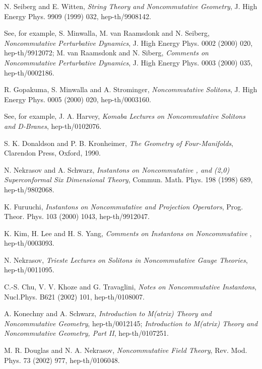 \documentclass[a4paper,a4paper]{article}
\begin{document}
\begin{thebibliography}{99}

 N. Seiberg and E. Witten, {\it String Theory
and Noncommutative Geometry}, J. High Energy Phys. 9909 (1999)
032, hep-th/9908142.

 See, for example, S. Minwalla, M. van Raamsdonk
 and N. Seiberg,
{\it Noncommutative Perturbative Dynamics}, J. High Energy Phys.
0002 (2000) 020, hep-th/9912072; M. van Raamsdonk and N. Siberg,
{\it Comments on Noncommutative Perturbative Dynamics}, J. High
Energy Phys. 0003 (2000) 035, hep-th/0002186.

 R. Gopakuma, S. Minwalla and A. Strominger,
{\it Noncommutative Solitons}, J. High Energy Phys. 0005 (2000)
020, hep-th/0003160.

 See, for example, J. A. Harvey, {\it Komaba Lectures
on Noncommutative Solitons and D-Branes}, hep-th/0102076.

 S. K. Donaldson and P. B. Kronheimer, {\it The
Geometry of Four-Manifolds}, Clarendon Press, Oxford, 1990.

 N. Nekrasov and A. Schwarz, {\it Instantons on
Noncommutative \coordHE{}, and (2,0) Superconformal Six Dimensional
Theory}, Commun. Math. Phys. 198 (1998) 689, hep-th/9802068.

 K. Furuuchi, {\it Instantons on Noncommutative
\coordHE{} and Projection Operators}, Prog. Theor. Phys. 103 (2000)
1043, hep-th/9912047.

 K. Kim, H. Lee and H. S. Yang, {\it Comments on
Instantons on Noncommutative \coordHE{}}, hep-th/0003093.

 N. Nekrasov, {\it Trieste Lectures on Solitons in
Noncommutative Gauge Theories}, hep-th/0011095.

 C.-S. Chu, V. V. Khoze and G. Travaglini, {\it
Notes on Noncommutative Instantons}, Nucl.Phys. B621 (2002) 101,
hep-th/0108007.

 A. Konechny and A. Schwarz, {\it Introduction to
M(atrix) Theory and Noncommutative Geometry}, hep-th/0012145; {\it
Introduction to M(atrix) Theory and Noncommutative Geometry, Part
II}, hep-th/0107251.

 M. R. Douglas and N. A. Nekrasov, {\it
Noncommutative Field Theory}, Rev. Mod. Phys. 73 (2002) 977,
hep-th/0106048.


\end{thebibliography}
\end{document}
